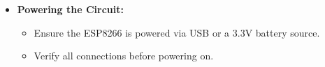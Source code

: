 {{\begin{enumerate}
\begin{itemize}
\begin{itemize}
            \item \textbf{Buzzer:}
            \begin{itemize}
                \item Positive terminal $\rightarrow$ GPIO2 (D4)
                \item Negative terminal $\rightarrow$ GND
            \end{itemize}
        \end{itemize}
        \item \textbf{Powering the Circuit:}
        \begin{itemize}
            \item Ensure the ESP8266 is powered via USB or a 3.3V battery source.
            \item Verify all connections before powering on.
        \end{itemize}
    \end{itemize}
    

\end{enumerate}}}

